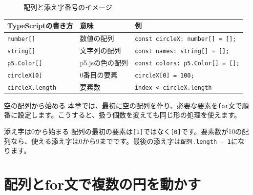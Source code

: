 \begin{figure}[htbp]
    \centering
    \caption{配列と添え字番号のイメージ}
    \label{fig:chapter10-array-index}
\end{figure}

{\footnotesize
\begin{center}
\begin{tabular}{lll}
\toprule
TypeScriptの書き方 & 意味 & 例 \\
\midrule
\texttt{number[]} & 数値の配列 & \texttt{const circleX: number[] = [];} \\
\texttt{string[]} & 文字列の配列 & \texttt{const names: string[] = [];} \\
\texttt{p5.Color[]} & p5.jsの色の配列 & \texttt{const colors: p5.Color[] = [];} \\
\texttt{circleX[0]} & 0番目の要素 & \texttt{circleX[0] = 100;} \\
\texttt{circleX.length} & 要素数 & \texttt{index < circleX.length} \\
\bottomrule
\end{tabular}
\end{center}
}

\begin{pointbox}{空の配列から始める}
本章では、最初に空の配列を作り、必要な要素を\texttt{for}文で順番に設定します。こうすると、扱う個数を変えても同じ形の処理を使えます。
\end{pointbox}

\begin{pointbox}{添え字は0から始まる}
配列の最初の要素は\texttt{[1]}ではなく\texttt{[0]}です。要素数が10の配列なら、使える添え字は0から9までです。最後の添え字は\texttt{配列.length - 1}になります。
\end{pointbox}

\section{配列とfor文で複数の円を動かす}

